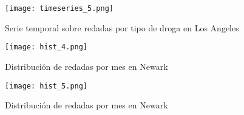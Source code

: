 \documentclass[12pt]{article}
\begin{document}
\begin{figure}[H]
	\caption{\label{timeseries_5} Serie temporal sobre redadas por tipo de droga en Los Angeles}
	\centering
	\hspace*{1cm}
	\texttt{[image: timeseries\_5.png]}
\end{figure}

\begin{figure}[H]
	\caption{\label{hist_4} Distribución de redadas por mes en Newark}
	\centering
	\hspace*{1cm}
	\texttt{[image: hist\_4.png]}
\end{figure}

\begin{figure}[H]
 	\caption{\label{hist_5} Distribución de redadas por mes en Newark}
 	\centering
 	\hspace*{1cm}
 	\texttt{[image: hist\_5.png]}
\end{figure}
\end{document}
